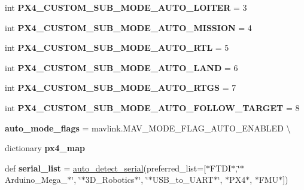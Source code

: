 \begin{DoxyCompactItemize}
\item 
\mbox{\label{namespacepymavlink_1_1mavutil_a92f6548114556af652b6b175fb5e44be}} 
int {\bfseries P\+X4\+\_\+\+C\+U\+S\+T\+O\+M\+\_\+\+S\+U\+B\+\_\+\+M\+O\+D\+E\+\_\+\+A\+U\+T\+O\+\_\+\+L\+O\+I\+T\+ER} = 3
\item 
\mbox{\label{namespacepymavlink_1_1mavutil_a153eb422f7f39e3c6e2a32ea13567ecf}} 
int {\bfseries P\+X4\+\_\+\+C\+U\+S\+T\+O\+M\+\_\+\+S\+U\+B\+\_\+\+M\+O\+D\+E\+\_\+\+A\+U\+T\+O\+\_\+\+M\+I\+S\+S\+I\+ON} = 4
\item 
\mbox{\label{namespacepymavlink_1_1mavutil_a4e0ce9b701247e9a35b12a13ec9d2550}} 
int {\bfseries P\+X4\+\_\+\+C\+U\+S\+T\+O\+M\+\_\+\+S\+U\+B\+\_\+\+M\+O\+D\+E\+\_\+\+A\+U\+T\+O\+\_\+\+R\+TL} = 5
\item 
\mbox{\label{namespacepymavlink_1_1mavutil_a0e886e3a7e3282bf94852836ee47ada0}} 
int {\bfseries P\+X4\+\_\+\+C\+U\+S\+T\+O\+M\+\_\+\+S\+U\+B\+\_\+\+M\+O\+D\+E\+\_\+\+A\+U\+T\+O\+\_\+\+L\+A\+ND} = 6
\item 
\mbox{\label{namespacepymavlink_1_1mavutil_afc5d33392a08ced60b37fcec5221ef1f}} 
int {\bfseries P\+X4\+\_\+\+C\+U\+S\+T\+O\+M\+\_\+\+S\+U\+B\+\_\+\+M\+O\+D\+E\+\_\+\+A\+U\+T\+O\+\_\+\+R\+T\+GS} = 7
\item 
\mbox{\label{namespacepymavlink_1_1mavutil_a5c8613d55aee9bb1eb9b4e741818e612}} 
int {\bfseries P\+X4\+\_\+\+C\+U\+S\+T\+O\+M\+\_\+\+S\+U\+B\+\_\+\+M\+O\+D\+E\+\_\+\+A\+U\+T\+O\+\_\+\+F\+O\+L\+L\+O\+W\+\_\+\+T\+A\+R\+G\+ET} = 8
\item 
\mbox{\label{namespacepymavlink_1_1mavutil_abff145f84bef16fa8ccf3ec9c194e72f}} 
{\bfseries auto\+\_\+mode\+\_\+flags} = mavlink.\+M\+A\+V\+\_\+\+M\+O\+D\+E\+\_\+\+F\+L\+A\+G\+\_\+\+A\+U\+T\+O\+\_\+\+E\+N\+A\+B\+L\+ED \textbackslash{}
\item 
dictionary {\bfseries px4\+\_\+map}
\item 
\mbox{\label{namespacepymavlink_1_1mavutil_ae279994be4b353d3acb4fd7a396e1164}} 
def {\bfseries serial\+\_\+list} = \hyperlink{namespacepymavlink_1_1mavutil_a256e344d1870c0a938cac5b21d3003be}{auto\+\_\+detect\+\_\+serial}(preferred\+\_\+list=\mbox{[}\textquotesingle{}$\ast$F\+T\+DI$\ast$\textquotesingle{},\char`\"{}$\ast$Arduino\+\_\+\+Mega\+\_$\ast$\char`\"{}, \char`\"{}$\ast$3\+D\+\_\+\+Robotics$\ast$\char`\"{}, \char`\"{}$\ast$\+U\+S\+B\+\_\+to\+\_\+\+U\+A\+R\+T$\ast$\char`\"{}, \textquotesingle{}$\ast$\+P\+X4$\ast$\textquotesingle{}, \textquotesingle{}$\ast$\+F\+M\+U$\ast$\textquotesingle{}\mbox{]})
\end{DoxyCompactItemize}



